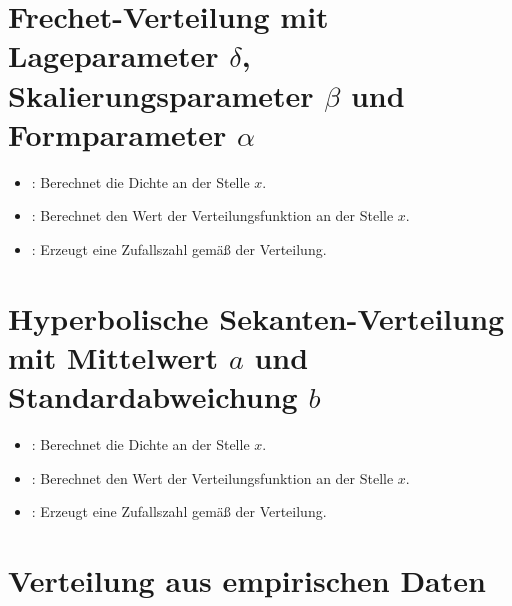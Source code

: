 \section{Frechet-Verteilung mit Lageparameter \texorpdfstring{$\delta$}{delta}, Skalierungsparameter \texorpdfstring{$\beta$}{beta} und Formparameter \texorpdfstring{$\alpha$}{alpha}}

\begin{itemize}

\item
{}:
Berechnet die Dichte an der Stelle $x$.

\item
{}:
Berechnet den Wert der Verteilungsfunktion an der Stelle $x$.

\item
{}:
Erzeugt eine Zufallszahl gemäß der Verteilung.

\end{itemize}



\section{Hyperbolische Sekanten-Verteilung mit Mittelwert \texorpdfstring{$a$}{a} und Standardabweichung \texorpdfstring{$b$}{b}}

\begin{itemize}

\item
{}:
Berechnet die Dichte an der Stelle $x$.

\item
{}:
Berechnet den Wert der Verteilungsfunktion an der Stelle $x$.

\item
{}:
Erzeugt eine Zufallszahl gemäß der Verteilung.

\end{itemize}



\section{Verteilung aus empirischen Daten}

